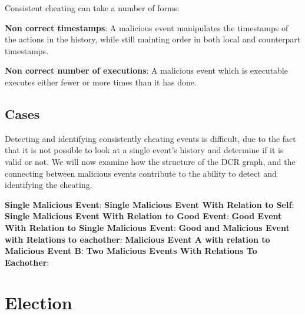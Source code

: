 	\newpar Consistent cheating can take a number of forms:
	
	
	\newpar \textbf{Non correct timestamps}: A malicious event manipulates the timestamps of the actions in the history, while still mainting order in both local and counterpart timestamps.
	
	\newpar \textbf{Non correct number of executions}: A malicious event which is executable executes either fewer or more times than it has done.
	
	\subsection{Cases}
	Detecting and identifying consistently cheating events is difficult, due to the fact that it is not possible to look at a single event's history and determine if it is valid or not. We will now examine how the structure of the DCR graph, and the connecting between malicious events contribute to the ability to detect and identifying the cheating.
	
	\newpar \textbf{Single Malicious Event}: 
	\newpar \textbf{Single Malicious Event With Relation to Self}:
	\newpar \textbf{Single Malicious Event With Relation to Good Event}: 
	\newpar \textbf{Good Event With Relation to Single Malicious Event}: 
	\newpar \textbf{Good and Malicious Event with Relations to eachother}:
	\newpar \textbf{Malicious Event A with relation to Malicious Event B}: 
	\newpar \textbf{Two Malicious Events With Relations To Eachother}:
	
	\section{Election}
